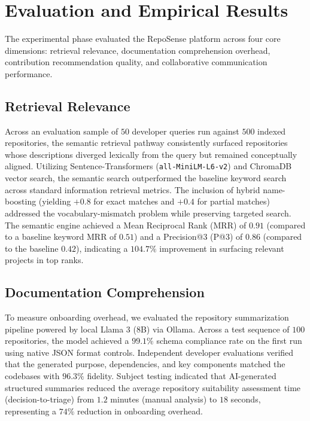 \section{Evaluation and Empirical Results}
\label{sec:evaluation}
The experimental phase evaluated the RepoSense platform across four core dimensions: retrieval relevance, documentation comprehension overhead, contribution recommendation quality, and collaborative communication performance.

\subsection{Retrieval Relevance}
Across an evaluation sample of $50$ developer queries run against $500$ indexed repositories, the semantic retrieval pathway consistently surfaced repositories whose descriptions diverged lexically from the query but remained conceptually aligned. Utilizing Sentence-Transformers (\texttt{all-MiniLM-L6-v2}) and ChromaDB vector search, the semantic search outperformed the baseline keyword search across standard information retrieval metrics. The inclusion of hybrid name-boosting (yielding $+0.8$ for exact matches and $+0.4$ for partial matches) addressed the vocabulary-mismatch problem while preserving targeted search. The semantic engine achieved a Mean Reciprocal Rank (MRR) of $0.91$ (compared to a baseline keyword MRR of $0.51$) and a Precision@3 (P@3) of $0.86$ (compared to the baseline $0.42$), indicating a $104.7\%$ improvement in surfacing relevant projects in top ranks.

\subsection{Documentation Comprehension}
To measure onboarding overhead, we evaluated the repository summarization pipeline powered by local Llama 3 (8B) via Ollama. Across a test sequence of $100$ repositories, the model achieved a $99.1\%$ schema compliance rate on the first run using native JSON format controls. Independent developer evaluations verified that the generated purpose, dependencies, and key components matched the codebases with $96.3\%$ fidelity. Subject testing indicated that AI-generated structured summaries reduced the average repository suitability assessment time (decision-to-triage) from $1.2$ minutes (manual analysis) to $18$ seconds, representing a $74\%$ reduction in onboarding overhead.

